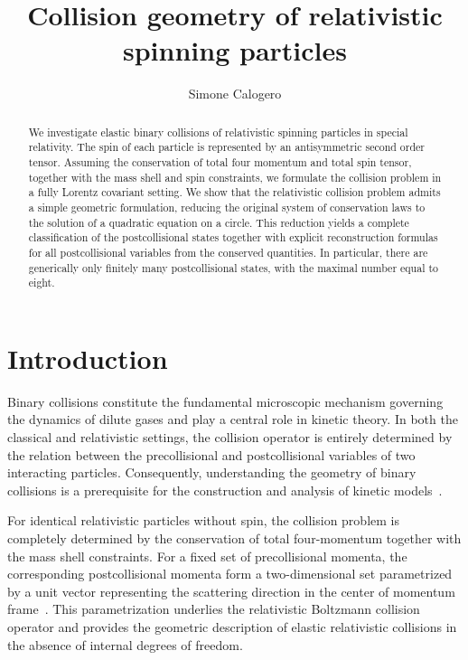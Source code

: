 \documentclass[12pt]{article}
\title{Collision geometry of relativistic spinning particles}
\author{Simone Calogero}
\theoremstyle{plain}
\theoremstyle{definition}
\begin{document}
\maketitle

\begin{abstract}
We investigate elastic binary collisions of relativistic spinning particles in special relativity. The spin of each particle is represented by an antisymmetric second order tensor. Assuming the conservation of total four momentum and total spin tensor, together with the mass shell and spin constraints, we formulate the collision problem in a fully Lorentz covariant setting.
We show that the relativistic collision problem admits a simple geometric formulation, reducing the original system of conservation laws to the solution of a quadratic equation on a circle. This reduction yields a complete classification of the postcollisional states together with explicit reconstruction formulas for all postcollisional variables from the conserved quantities. In particular, there are generically only finitely many postcollisional states, with the maximal number equal to eight. 
\end{abstract}


\section{Introduction}\label{intro}
Binary collisions constitute the fundamental microscopic mechanism governing the dynamics of dilute gases and play a central role in kinetic theory. In both the classical and relativistic settings, the collision operator is entirely determined by the relation between the precollisional and postcollisional variables of two interacting particles. Consequently, understanding the geometry of binary collisions is a prerequisite for the construction and analysis of kinetic models~\cite{Cerci}.

For identical relativistic particles without spin, the collision problem is completely determined by the conservation of total four-momentum together with the mass shell constraints. For a fixed set of precollisional momenta, the corresponding postcollisional momenta form a two-dimensional set parametrized by a unit vector
representing the scattering direction in the center of momentum frame~\cite{Groot, Glassey,Strain}. This parametrization underlies the relativistic Boltzmann collision operator and provides the geometric description of elastic relativistic collisions in the absence of internal degrees of freedom.
\end{document}
